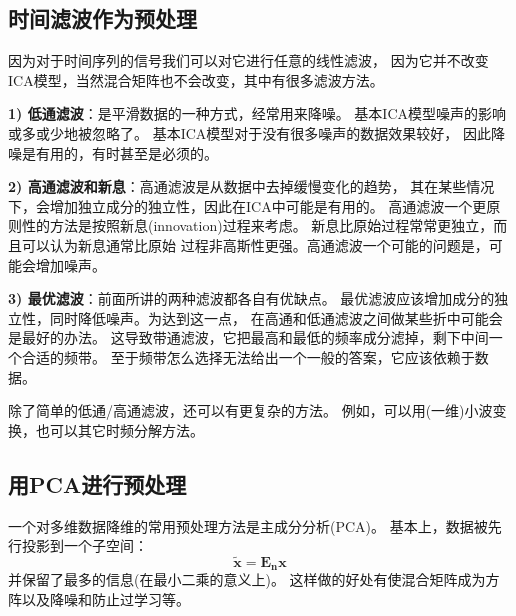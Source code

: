\subsection{时间滤波作为预处理}
因为对于时间序列的信号我们可以对它进行任意的线性滤波，
因为它并不改变ICA模型，当然混合矩阵也不会改变，其中有很多滤波方法。
    
\textbf{1) 低通滤波}：是平滑数据的一种方式，经常用来降噪。
基本ICA模型噪声的影响或多或少地被忽略了。
基本ICA模型对于没有很多噪声的数据效果较好，
因此降噪是有用的，有时甚至是必须的。

\textbf{2) 高通滤波和新息}：高通滤波是从数据中去掉缓慢变化的趋势，
其在某些情况下，会增加独立成分的独立性，因此在ICA中可能是有用的。
高通滤波一个更原则性的方法是按照新息(innovation)过程来考虑。
新息比原始过程常常更独立，而且可以认为新息通常比原始
过程非高斯性更强。高通滤波一个可能的问题是，可能会增加噪声。

\textbf{3) 最优滤波}：前面所讲的两种滤波都各自有优缺点。
最优滤波应该增加成分的独立性，同时降低噪声。为达到这一点，
在高通和低通滤波之间做某些折中可能会是最好的办法。
这导致带通滤波，它把最高和最低的频率成分滤掉，剩下中间一个合适的频带。
至于频带怎么选择无法给出一个一般的答案，它应该依赖于数据。
 
除了简单的低通/高通滤波，还可以有更复杂的方法。
例如，可以用(一维)小波变换，也可以其它时频分解方法。
    
\subsection{用PCA进行预处理}
一个对多维数据降维的常用预处理方法是主成分分析(PCA)。
基本上，数据被先行投影到一个子空间：
\begin{equation}
\bm{\tilde{x}=E_n x}
\end{equation}
并保留了最多的信息(在最小二乘的意义上)。
这样做的好处有使混合矩阵成为方阵以及降噪和防止过学习等。
